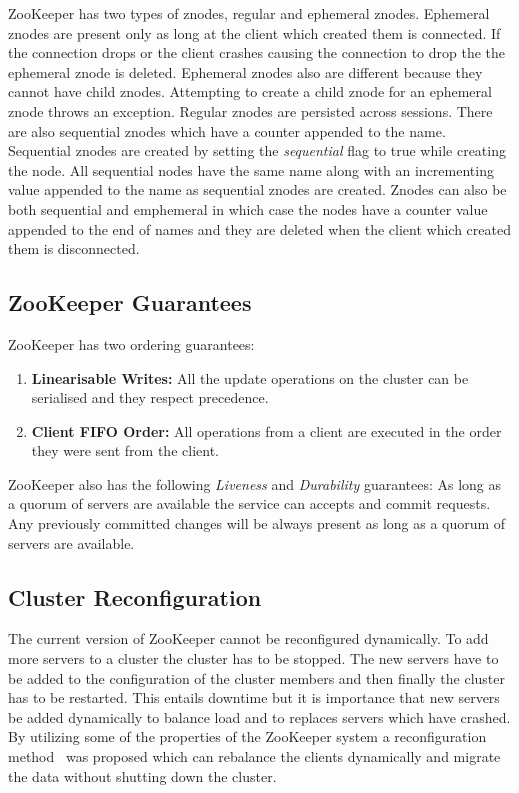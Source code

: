 \vspace{1.5em}

\vspace{1.5em}

ZooKeeper has two types of znodes, regular and ephemeral znodes. Ephemeral znodes are present only as long at the client which created them is connected. If the connection drops or the client crashes causing the connection to drop the the ephemeral znode is deleted. Ephemeral znodes also are different because they cannot have child znodes. Attempting to create a child znode for an ephemeral znode throws an exception. Regular znodes are persisted across sessions. There are also sequential znodes which have a counter appended to the name. Sequential znodes are created by setting the \textit{sequential} flag to true while creating the node. All sequential nodes have the same name along with an incrementing value appended to the name as sequential znodes are created. Znodes can also be both sequential and emphemeral in which case the nodes have a counter value appended to the end of names and they are deleted when the client which created them is disconnected.

\subsection{ZooKeeper Guarantees}
ZooKeeper has two ordering guarantees:
\begin{enumerate}
	\item \textbf{Linearisable Writes:} All the update operations on the cluster can be serialised and they respect precedence.
	\item \textbf{Client FIFO Order:} All operations from a client are executed in the order they were sent from the client.
\end{enumerate}
ZooKeeper also has the following \textit{Liveness} and \textit{Durability} guarantees: As long as a quorum of servers are available the service can accepts and commit requests. Any previously committed changes will be always present as long as a quorum of servers are available.

\subsection{Cluster Reconfiguration}
	The current version of ZooKeeper cannot be reconfigured dynamically. To add more servers to a cluster the cluster has to be stopped. The new servers have to be added to the configuration of the cluster members and then finally the cluster has to be restarted. This entails downtime but it is importance that new servers be added dynamically to balance load and to replaces servers which have crashed. By utilizing some of the properties of the ZooKeeper system a reconfiguration method~\cite{shraer2012dynamic} was proposed which can rebalance the clients dynamically and migrate the data without shutting down the cluster.

